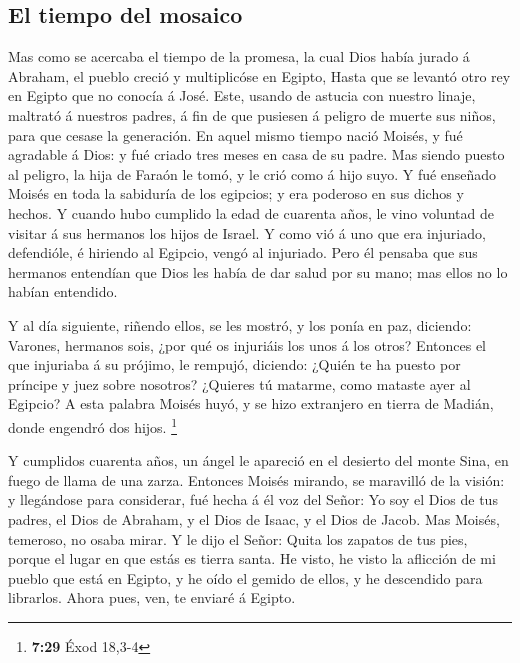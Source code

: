 \hypertarget{el-tiempo-del-mosaico}{%
\subsection{El tiempo del mosaico}\label{el-tiempo-del-mosaico}}

 Mas como se acercaba el tiempo de la promesa, la cual Dios
había jurado á Abraham, el pueblo creció y multiplicóse en Egipto,
 Hasta que se levantó otro rey en Egipto que no conocía á
José.  Este, usando de astucia con nuestro linaje, maltrató
á nuestros padres, á fin de que pusiesen á peligro de muerte sus niños,
para que cesase la generación.  En aquel mismo tiempo nació
Moisés, y fué agradable á Dios: y fué criado tres meses en casa de su
padre.  Mas siendo puesto al peligro, la hija de Faraón le
tomó, y le crió como á hijo suyo.  Y fué enseñado Moisés en
toda la sabiduría de los egipcios; y era poderoso en sus dichos y
hechos.  Y cuando hubo cumplido la edad de cuarenta años,
le vino voluntad de visitar á sus hermanos los hijos de Israel.
 Y como vió á uno que era injuriado, defendióle, é hiriendo
al Egipcio, vengó al injuriado.  Pero él pensaba que sus
hermanos entendían que Dios les había de dar salud por su mano; mas
ellos no lo habían entendido.

 Y al día siguiente, riñendo ellos, se les mostró, y los
ponía en paz, diciendo: Varones, hermanos sois, ¿por qué os injuriáis
los unos á los otros?  Entonces el que injuriaba á su
prójimo, le rempujó, diciendo: ¿Quién te ha puesto por príncipe y juez
sobre nosotros?  ¿Quieres tú matarme, como mataste ayer al
Egipcio?  A esta palabra Moisés huyó, y se hizo extranjero
en tierra de Madián, donde engendró dos hijos. \footnote{\textbf{7:29}
  Éxod 18,3-4}

 Y cumplidos cuarenta años, un ángel le apareció en el
desierto del monte Sina, en fuego de llama de una zarza. 
Entonces Moisés mirando, se maravilló de la visión: y llegándose para
considerar, fué hecha á él voz del Señor:  Yo soy el Dios
de tus padres, el Dios de Abraham, y el Dios de Isaac, y el Dios de
Jacob. Mas Moisés, temeroso, no osaba mirar.  Y le dijo el
Señor: Quita los zapatos de tus pies, porque el lugar en que estás es
tierra santa.  He visto, he visto la aflicción de mi pueblo
que está en Egipto, y he oído el gemido de ellos, y he descendido para
librarlos. Ahora pues, ven, te enviaré á Egipto.

